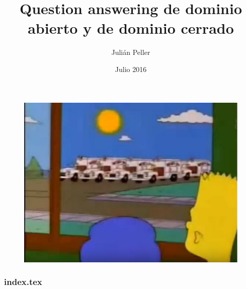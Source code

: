 \documentclass{beamer}
\title{Question answering de dominio abierto y de dominio cerrado}
\author{Julián Peller}
\date{Julio 2016} %
\begin{document}
\begin{frame}
\begin{figure}
  \centering
    \includegraphics[scale=.6]{graficos/presentacion/adios}
\end{figure}
\end{frame}

\begin{frame}
  \titlepage
\end{frame}



\begin{frame}
  \frametitle{index.tex}
  \tableofcontents
\end{frame}










\end{document}
